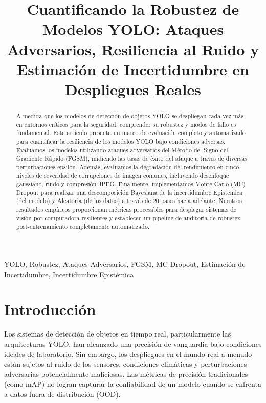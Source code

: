 \documentclass[conference]{IEEEtran}
\begin{document}
\title{Cuantificando la Robustez de Modelos YOLO: Ataques Adversarios, Resiliencia al Ruido y Estimación de Incertidumbre en Despliegues Reales}

\author{
}

\maketitle

\begin{abstract}
A medida que los modelos de detección de objetos YOLO se despliegan cada vez más en entornos críticos para la seguridad, comprender su robustez y modos de fallo es fundamental. Este artículo presenta un marco de evaluación completo y automatizado para cuantificar la resiliencia de los modelos YOLO bajo condiciones adversas. Evaluamos los modelos utilizando ataques adversarios del Método del Signo del Gradiente Rápido (FGSM), midiendo las tasas de éxito del ataque a través de diversas perturbaciones epsilon. Además, evaluamos la degradación del rendimiento en cinco niveles de severidad de corrupciones de imagen comunes, incluyendo desenfoque gaussiano, ruido y compresión JPEG. Finalmente, implementamos Monte Carlo (MC) Dropout para realizar una descomposición Bayesiana de la incertidumbre Epistémica (del modelo) y Aleatoria (de los datos) a través de 20 pases hacia adelante. Nuestros resultados empíricos proporcionan métricas procesables para desplegar sistemas de visión por computadora resilientes y establecen un pipeline de auditoría de robustez post-entrenamiento completamente automatizado.
\end{abstract}

\begin{IEEEkeywords}
YOLO, Robustez, Ataques Adversarios, FGSM, MC Dropout, Estimación de Incertidumbre, Incertidumbre Epistémica
\end{IEEEkeywords}

\section{Introducción}
Los sistemas de detección de objetos en tiempo real, particularmente las arquitecturas YOLO, han alcanzado una precisión de vanguardia bajo condiciones ideales de laboratorio. Sin embargo, los despliegues en el mundo real a menudo están sujetos al ruido de los sensores, condiciones climáticas y perturbaciones adversarias potencialmente maliciosas. Las métricas de precisión tradicionales (como mAP) no logran capturar la confiabilidad de un modelo cuando se enfrenta a datos fuera de distribución (OOD).
\end{document}
